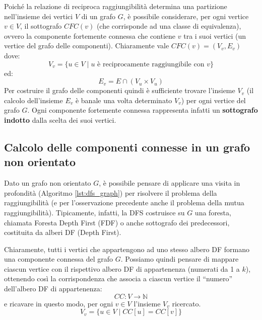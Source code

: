\begin{osservation}
	Poiché la relazione di reciproca raggiungibilità determina una partizione nell'insieme dei vertici $V$ di un grafo $G$, è possibile considerare, per ogni vertice $v \in V$, il sottografo $CFC(v)$ (che corrisponde ad una classe di equivalenza), ovvero la componente fortemente connessa che contiene $v$ tra i suoi vertici (un vertice del grafo delle componenti). Chiaramente vale $CFC(v) = (V_{v},E_{v})$ dove:
\begin{displaymath}
	V_{v} = \{u \in V \; | \; \text{$u$ è reciprocamente raggiungibile con $v$}\}
\end{displaymath}
ed:
\begin{displaymath}
	E_{v}= E \cap (V_{u} \times V_{u})
\end{displaymath}
Per costruire il grafo delle componenti quindi è sufficiente trovare l'insieme $V_{v}$ (il calcolo dell'insieme $E_{v}$ è banale una volta determinato $V_{v}$) per ogni vertice del grafo $G$. Ogni componente fortemente connessa rappresenta infatti un \textbf{sottografo indotto} dalla scelta dei suoi vertici.
\end{osservation}

\subsection{Calcolo delle componenti connesse in un grafo non orientato}
Dato un grafo non orientato $G$, è possibile pensare di applicare una visita in profondità (Algoritmo \ref{lst:dfs_graph}) per risolvere il problema della raggiungibilità (e per l'osservazione precedente anche il problema della mutua raggiungibilità). Tipicamente, infatti, la DFS costruisce su $G$ una foresta, chiamata Foresta Depth First (FDF) o anche sottografo dei predecessori, costituita da alberi DF (Depth First). 

Chiaramente, tutti i vertici che appartengono ad uno stesso albero DF formano una componente connessa del grafo $G$. Possiamo quindi pensare di mappare ciascun vertice con il rispettivo albero DF di appartenenza (numerati da 1 a $k$), ottenendo così la corrispondenza che associa a ciascun vertice il ``numero'' dell'albero DF di appartenenza:
\begin{displaymath}
	CC : V \longrightarrow \mathbb{N}
\end{displaymath}
e ricavare in questo modo, per ogni $v \in V$ l'insieme $V_{v}$ ricercato.
\begin{displaymath}
	V_{v} = \{u \in V \; | \; CC[u] = CC[v] \}
\end{displaymath}

